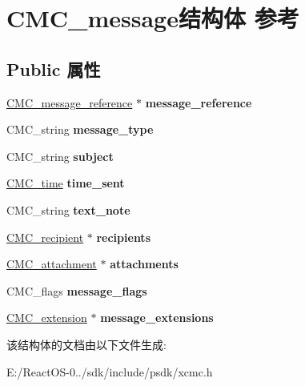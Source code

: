 \hypertarget{struct_c_m_c__message}{}\section{C\+M\+C\+\_\+message结构体 参考}
\label{struct_c_m_c__message}
\subsection*{Public 属性}
\begin{DoxyCompactItemize}
\item 
\mbox{\label{struct_c_m_c__message_ad52dbf28e7211481ffd6f9abb8169842}} 
\hyperlink{struct_c_m_c__counted__string}{C\+M\+C\+\_\+message\+\_\+reference} $\ast$ {\bfseries message\+\_\+reference}
\item 
\mbox{\label{struct_c_m_c__message_a2d6aed500681a0f8f7d7da1ab80a5624}} 
C\+M\+C\+\_\+string {\bfseries message\+\_\+type}
\item 
\mbox{\label{struct_c_m_c__message_a110082c77c09d5673ea3a959635d08ca}} 
C\+M\+C\+\_\+string {\bfseries subject}
\item 
\mbox{\label{struct_c_m_c__message_a97cf7632ba4f2a058c8c189939e70001}} 
\hyperlink{struct_c_m_c__time}{C\+M\+C\+\_\+time} {\bfseries time\+\_\+sent}
\item 
\mbox{\label{struct_c_m_c__message_ae81a741afe4f866e6beff75af95c82bc}} 
C\+M\+C\+\_\+string {\bfseries text\+\_\+note}
\item 
\mbox{\label{struct_c_m_c__message_a912ec04f0d24167cad11bcc68b151f8d}} 
\hyperlink{struct_c_m_c__recipient}{C\+M\+C\+\_\+recipient} $\ast$ {\bfseries recipients}
\item 
\mbox{\label{struct_c_m_c__message_a217bbc73bbfa5b537fce13d671328757}} 
\hyperlink{struct_c_m_c__attachment__s}{C\+M\+C\+\_\+attachment} $\ast$ {\bfseries attachments}
\item 
\mbox{\label{struct_c_m_c__message_ae19559ab056f1568f7fc69dd80b90cda}} 
C\+M\+C\+\_\+flags {\bfseries message\+\_\+flags}
\item 
\mbox{\label{struct_c_m_c__message_acfd03a945c8577f34ab1ba16acc14fdd}} 
\hyperlink{struct_c_m_c__extension}{C\+M\+C\+\_\+extension} $\ast$ {\bfseries message\+\_\+extensions}
\end{DoxyCompactItemize}


该结构体的文档由以下文件生成\+:\begin{DoxyCompactItemize}
\item 
E\+:/\+React\+O\+S-\/0../sdk/include/psdk/xcmc.\+h\end{DoxyCompactItemize}
